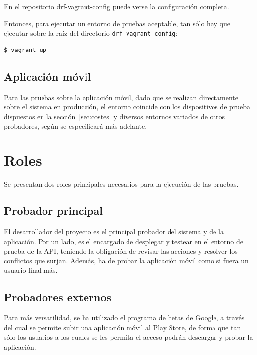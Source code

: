 En el repositorio drf-vagrant-config puede verse la configuración completa.

Entonces, para ejecutar un entorno de pruebas aceptable, tan sólo hay que
ejecutar sobre la raíz del directorio \texttt{drf-vagrant-config}:

\begin{verbatim}
$ vagrant up
\end{verbatim}


\subsection{Aplicación móvil}

Para las pruebas sobre la aplicación móvil, dado que se realizan directamente
sobre el sistema en producción, el entorno coincide con los dispositivos de
prueba dispuestos en la sección~\ref{sec:costes} y diversos entornos variados de
otros probadores, según se especificará más adelante.


\section{Roles}

Se presentan dos roles principales necesarios para la ejecución de las pruebas.

\subsection{Probador principal}

El desarrollador del proyecto es el principal probador del sistema y de la
aplicación. Por un lado, es el encargado de desplegar y testear en el entorno
de prueba de la API, teniendo la obligación de revisar las acciones y resolver
los conflictos que surjan. Además, ha de probar la aplicación móvil como si
fuera un usuario final más.

\subsection{Probadores externos}

Para más versatilidad, se ha utilizado el programa de betas de Google, a través
del cual se permite subir una aplicación móvil al Play Store, de forma que tan
sólo los usuarios a los cuales se les permita el acceso podrán descargar y
probar la aplicación.

